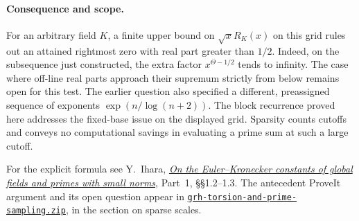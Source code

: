 \paragraph{Consequence and scope.}
For an arbitrary field $K$, a finite upper bound on
$\sqrt{x}R_K(x)$ on this grid rules out an attained rightmost zero
with real part greater than $1/2$. Indeed, on the subsequence just
constructed, the extra factor $x^{\Theta-1/2}$ tends to infinity.
The case where off-line real parts approach their supremum strictly
from below remains open for this test. The earlier question also specified
a different, preassigned sequence of exponents $\exp(n/\log(n+2))$.
The block recurrence proved here addresses the fixed-base issue on
the displayed grid. Sparsity counts cutoffs and conveys no
computational savings in evaluating a prime sum at such a large cutoff.

\smallskip\noindent
For the explicit formula see Y.~Ihara, \href{https://www.kurims.kyoto-u.ac.jp/~kenkyubu/emeritus/ihara/Publications-and-Recent-Preprints/RecentArticles/pdf-files/1A.pdf}{\emph{On the Euler--Kronecker constants of global fields and primes with small norms}},
Part~1, \S\S1.2--1.3.
The antecedent ProveIt argument and its open question appear in
\href{https://github.com/VladimirReshetnikov/ProveIt/blob/d31039a48d963692e5a5176f47b6603fc9e9d9cf/docs/incoming/grh-torsion-and-prime-sampling.zip}{\texttt{grh-torsion-and-prime-sampling.zip}},
in the section on sparse scales.
